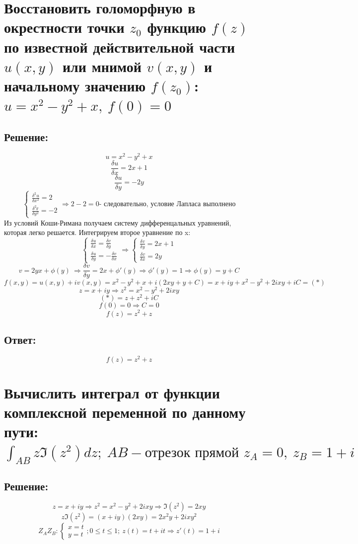 \documentclass{article}
\begin{document}
	
	
	\section{Восстановить голоморфную в окрестности точки $z_0$ функцию $f(z)$ по известной действительной части $u(x,y)$ или мнимой $v(x,y)$ и начальному значению $f(z_0)$: $u = x^2 - y^2 + x, \ f(0) = 0$}
	\subsection{Решение:}
	\[u = x^2 - y^2 + x\]
	\[\frac{\delta u}{\delta x} = 2x+1\]
	\[\frac{\delta u}{\delta y} = -2y\]
	\[\begin{cases}
		\frac{\delta^2 u}{\delta x ^2} = 2\\
		\frac{\delta ^ 2 г}{\delta y^2} = -2
	\end{cases} \Rightarrow 2 -2 = 0 \text{- следовательно, условие Лапласа выполнено}\]
	Из условий Коши-Римана получаем систему дифференцальных уравнений, которая легко решается. Интегрируем второе уравнение по x:
	\[\begin{cases}
		\frac{\delta u }{\delta x} = \frac{\delta v}{\delta y} \\
		\frac{\delta u} {\delta y} = - \frac{\delta v}{\delta x}
	\end{cases} \Rightarrow
	\begin{cases}
		\frac{\delta v}{\delta y} = 2x+1 \\
		\frac{\delta v}{\delta x} = 2y
	\end{cases}\]
	\[v = 2yx + \phi (y) \ \Rightarrow \frac{\delta v}{\delta y} =2x + \phi'(y) \Rightarrow \phi' (y) = 1 \Rightarrow \phi(y) = y+C\]
	\[f(x,y) = u(x,y) + iv(x,y) = x^2 - y^2 +x + i (2xy + y + C)  = x + iy + x^2 - y^2 + 2ixy + iC =(*)\]
	\[z = x + iy \Rightarrow z ^2 = x^2 - y^2 +2ixy\]
	\[(*) = z + z^2 + iC\]
	\[f(0) = 0 \Rightarrow C = 0\]
	\[f(z) = z^2 + z\]
	\subsection{Ответ:}
	\[f(z) = z^2 + z\]
	
	\section{Вычислить интеграл от функции комплексной переменной по данному пути: $\int_{AB} z \Im(z^2) dz; \ AB - \text{отрезок прямой } z_A = 0, \ z_B = 1 + i$}
	\subsection{Решение:}
	\[z= x +iy \Rightarrow z ^2 = x^2 - y^2 + 2ixy \Rightarrow \Im(z^2) = 2xy\]
	\[z\Im (z^2) = (x+iy)(2xy) = 2x^2y + 2ixy^2\]
	\[Z_AZ_B: \begin{cases}
		x =t \\ y = t
	\end{cases}; 0 \le t \le 1; \ z(t) = t + it \Rightarrow z'(t) = 1 + i\]
	
\end{document}
